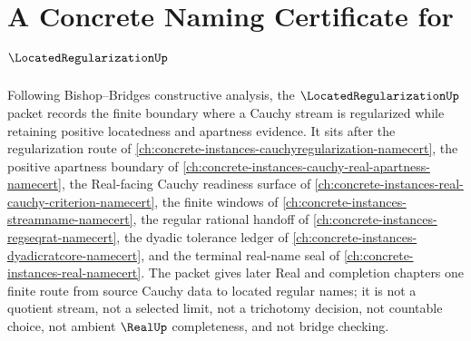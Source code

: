 \chapter{A Concrete Naming Certificate for $\LocatedRegularizationUp$}
\label{ch:concrete-instances-located-regularization-namecert}

Following Bishop--Bridges constructive analysis, the $\LocatedRegularizationUp$ packet records the finite boundary where a Cauchy stream is regularized while retaining positive locatedness and apartness evidence. It sits after the regularization route of \autoref{ch:concrete-instances-cauchyregularization-namecert}, the positive apartness boundary of \autoref{ch:concrete-instances-cauchy-real-apartness-namecert}, the Real-facing Cauchy readiness surface of \autoref{ch:concrete-instances-real-cauchy-criterion-namecert}, the finite windows of \autoref{ch:concrete-instances-streamname-namecert}, the regular rational handoff of \autoref{ch:concrete-instances-regseqrat-namecert}, the dyadic tolerance ledger of \autoref{ch:concrete-instances-dyadicratcore-namecert}, and the terminal real-name seal of \autoref{ch:concrete-instances-real-namecert}. The packet gives later Real and completion chapters one finite route from source Cauchy data to located regular names; it is not a quotient stream, not a selected limit, not a trichotomy decision, not countable choice, not ambient $\RealUp$ completeness, and not bridge checking.

